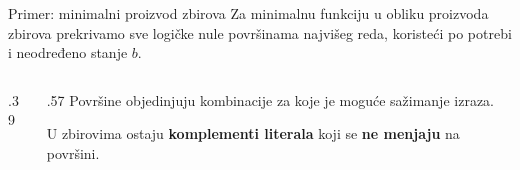 \begin{frame}[label=02-s044]{Primer: minimalni proizvod zbirova}
\setlength{\parskip}{0pt}
Za minimalnu funkciju u obliku proizvoda zbirova prekrivamo sve logičke nule površinama najvišeg reda, koristeći po potrebi i neodređeno stanje \(b\).
\par\vspace{2mm}
\begin{columns}[T,onlytextwidth]
\begin{column}{.39\textwidth}\centering

\end{column}
\begin{column}{.57\textwidth}
Površine objedinjuju kombinacije za koje je moguće sažimanje izraza.
\par\vspace{2mm}
U zbirovima ostaju \alert{\textbf{komplementi literala}} koji se \alert{\textbf{ne menjaju}} na površini.
\par\vspace{5mm}
\par{}
\end{column}
\end{columns}
\end{frame}
